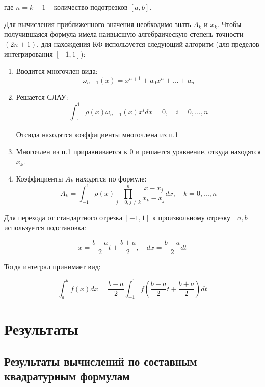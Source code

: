 \documentclass[12pt,a4paper]{article}
\begin{document}
где $n = k-1$ – количество подотрезков $[a,b]$.

Для вычисления приближенного значения необходимо знать $A_k$ и $x_k$. Чтобы получившаяся формула имела наивысшую алгебраическую степень точности $(2n+1)$, для нахождения КФ используется следующий алгоритм (для пределов интегрирования $[-1,1]$):

\begin{enumerate}
\item Вводится многочлен вида:
\begin{equation}
\omega_{n+1}(x) = x^{n+1} + a_0 x^n + ... + a_n
\end{equation}

\item Решается СЛАУ:
\begin{equation}
\int_{-1}^{1} \rho(x) \omega_{n+1}(x) x^i dx = 0, \quad i = 0, ..., n
\end{equation}

Отсюда находятся коэффициенты многочлена из п.1

\item Многочлен из п.1 приравнивается к 0 и решается уравнение, откуда находятся $x_k$.

\item Коэффициенты $A_k$ находятся по формуле:
\begin{equation}
A_k = \int_{-1}^{1} \rho(x) \prod_{j=0, j \neq k}^{n} \frac{x - x_j}{x_k - x_j} dx, \quad k = 0, ..., n
\end{equation}
\end{enumerate}

Для перехода от стандартного отрезка $[-1,1]$ к произвольному отрезку $[a,b]$ используется подстановка:

\begin{equation}
x = \frac{b-a}{2}t + \frac{b+a}{2}, \quad dx = \frac{b-a}{2}dt
\end{equation}

Тогда интеграл принимает вид:

\begin{equation}
\int_{a}^{b} f(x) dx = \frac{b-a}{2} \int_{-1}^{1} f\left(\frac{b-a}{2}t + \frac{b+a}{2}\right) dt
\end{equation}

\section{Результаты}

\subsection{Результаты вычислений по составным квадратурным формулам}
\end{document}
